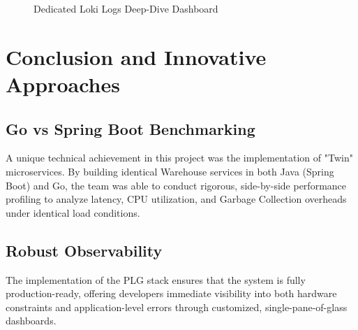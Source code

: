 \documentclass[12pt,a4paper]{report}
\begin{document}
\begin{figure}[H]
    \centering
    \caption{Dedicated Loki Logs Deep-Dive Dashboard}
\end{figure}

\chapter{Conclusion and Innovative Approaches}

\section{Go vs Spring Boot Benchmarking}
A unique technical achievement in this project was the implementation of "Twin" microservices. By building identical Warehouse services in both Java (Spring Boot) and Go, the team was able to conduct rigorous, side-by-side performance profiling to analyze latency, CPU utilization, and Garbage Collection overheads under identical load conditions.

\section{Robust Observability}
The implementation of the PLG stack ensures that the system is fully production-ready, offering developers immediate visibility into both hardware constraints and application-level errors through customized, single-pane-of-glass dashboards.
\end{document}
